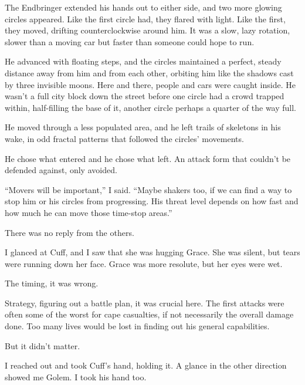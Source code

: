 The Endbringer extended his hands out to either side, and two more glowing circles appeared.  Like the first circle had, they flared with light.  Like the first, they moved, drifting counterclockwise around him.  It was a slow, lazy rotation, slower than a moving car but faster than someone could hope to run.



He advanced with floating steps, and the circles maintained a perfect, steady distance away from him and from each other, orbiting him like the shadows cast by three invisible moons.  Here and there, people and cars were caught inside.  He wasn't a full city block down the street before one circle had a crowd trapped within, half-filling the base of it, another circle perhaps a quarter of the way full.



He moved through a less populated area, and he left trails of skeletons in his wake, in odd fractal patterns that followed the circles' movements.



He chose what entered and he chose what left.  An attack form that couldn't be defended against, only avoided.



``Movers will be important,'' I said.  ``Maybe shakers too, if we can find a way to stop him or his circles from progressing.  His threat level depends on how fast and how much he can move those time-stop areas.''



There was no reply from the others.



I glanced at Cuff, and I saw that she was hugging Grace.  She was silent, but tears were running down her face.  Grace was more resolute, but her eyes were wet.



The timing, it was wrong.



Strategy, figuring out a battle plan, it was crucial here.  The first attacks were often some of the worst for cape casualties, if not necessarily the overall damage done.  Too many lives would be lost in finding out his general capabilities.



But it didn't matter.



I reached out and took Cuff's hand, holding it.  A glance in the other direction showed me Golem.  I took his hand too.



